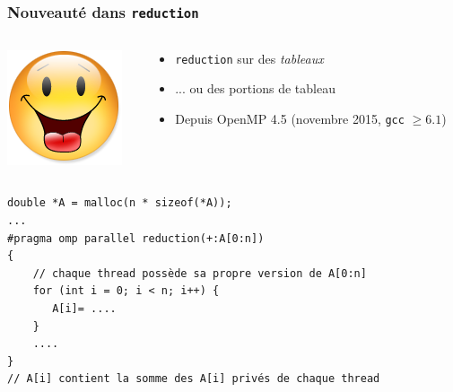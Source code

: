 \documentclass{beamer}
\begin{document}


\begin{frame}[fragile]
  \frametitle{Nouveauté dans \texttt{reduction}}

  \begin{columns}[b]
    \begin{column}{.1\textwidth}
      \includegraphics[width=\textwidth]{Content.png}
    \end{column}
    \begin{column}{.9\textwidth}
      \begin{itemize}
      \item \texttt{reduction} sur des \emph{tableaux}
      \item ... ou des portions de tableau
      \item Depuis OpenMP 4.5 (novembre 2015, \texttt{gcc} $\geq 6.1$)
      \end{itemize}
    \end{column}
  \end{columns}

\bigskip
  
\begin{verbatim}
double *A = malloc(n * sizeof(*A));
...
#pragma omp parallel reduction(+:A[0:n])
{
    // chaque thread possède sa propre version de A[0:n]
    for (int i = 0; i < n; i++) {
       A[i]= ....
    }
    ....
}
// A[i] contient la somme des A[i] privés de chaque thread 
\end{verbatim} 
\end{frame}
\end{document}
